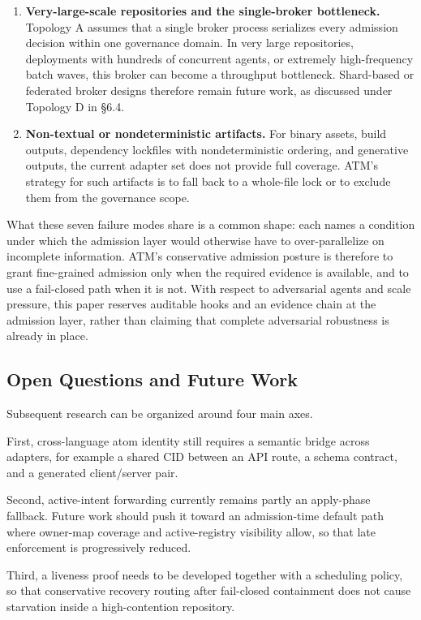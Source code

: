 \documentclass[9pt,letterpaper]{extarticle}
\begin{document}
\begin{enumerate}
\item \textbf{Very-large-scale repositories and the single-broker bottleneck.} Topology A assumes that a single broker process serializes every admission decision within one governance domain. In very large repositories, deployments with hundreds of concurrent agents, or extremely high-frequency batch waves, this broker can become a throughput bottleneck. Shard-based or federated broker designs therefore remain future work, as discussed under Topology D in §6.4.
\item \textbf{Non-textual or nondeterministic artifacts.} For binary assets, build outputs, dependency lockfiles with nondeterministic ordering, and generative outputs, the current adapter set does not provide full coverage. ATM's strategy for such artifacts is to fall back to a whole-file lock or to exclude them from the governance scope.
\end{enumerate}

What these seven failure modes share is a common shape: each names a condition under which the admission layer would otherwise have to over-parallelize on incomplete information. ATM's conservative admission posture is therefore to grant fine-grained admission only when the required evidence is available, and to use a fail-closed path when it is not. With respect to adversarial agents and scale pressure, this paper reserves auditable hooks and an evidence chain at the admission layer, rather than claiming that complete adversarial robustness is already in place.

\subsection{Open Questions and Future Work}

Subsequent research can be organized around four main axes.

First, cross-language atom identity still requires a semantic bridge across adapters, for example a shared CID between an API route, a schema contract, and a generated client/server pair.

Second, active-intent forwarding currently remains partly an apply-phase fallback. Future work should push it toward an admission-time default path where owner-map coverage and active-registry visibility allow, so that late enforcement is progressively reduced.

Third, a liveness proof needs to be developed together with a scheduling policy, so that conservative recovery routing after fail-closed containment does not cause starvation inside a high-contention repository.
\end{document}
